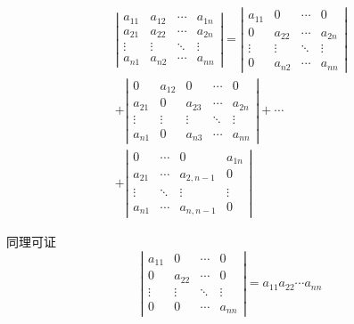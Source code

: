 \begin{frame}
  $$
  \begin{array}{l}
    \left|
    \begin{array}{cccc}
      a_{11}  &  a_{12} & \cdots & a_{1n} \\
      a_{21}  &  a_{22} & \cdots & a_{2n} \\
      \vdots & \vdots & \ddots & \vdots\\  
      a_{n1}  &  a_{n2} & \cdots & a_{nn} 
    \end{array}
    \right| = 
    \left|
    \begin{array}{cccc}
      a_{11}  &  0 & \cdots & 0 \\
      0  &  a_{22} & \cdots & a_{2n} \\
      \vdots & \vdots & \ddots & \vdots\\  
      0  &  a_{n2} & \cdots & a_{nn} 
    \end{array}
    \right|  \\[0.4in]
    + \left|
    \begin{array}{ccccc}
      0  &  a_{12} & 0 & \cdots & 0 \\
      a_{21} & 0  &  a_{23} & \cdots & a_{2n} \\
      \vdots & \vdots & \vdots & \ddots & \vdots\\  
      a_{n1}  & 0&  a_{n3} & \cdots & a_{nn} 
    \end{array}
    \right| + \cdots  \\[0.4in]
    + 
        \left|
    \begin{array}{cccc}
      0 & \cdots & 0 & a_{1n} \\
      a_{21}  &   \cdots & a_{2,n-1} & 0 \\
      \vdots &  \ddots & \vdots & \vdots\\  
      a_{n1}  &   \cdots & a_{n,n-1} & 0
    \end{array}
    \right| 
  \end{array}
  $$
\end{frame}


\begin{frame}
  同理可证
  $$
  \left|
  \begin{array}{cccc}
    a_{11}  &  0 & \cdots & 0 \\
    0  &  a_{22} & \cdots & 0 \\
    \vdots & \vdots & \ddots & \vdots\\  
    0  &  0 & \cdots & a_{nn} 
  \end{array}
  \right| = a_{11}a_{22}\cdots a_{nn}
  $$

\end{frame}


